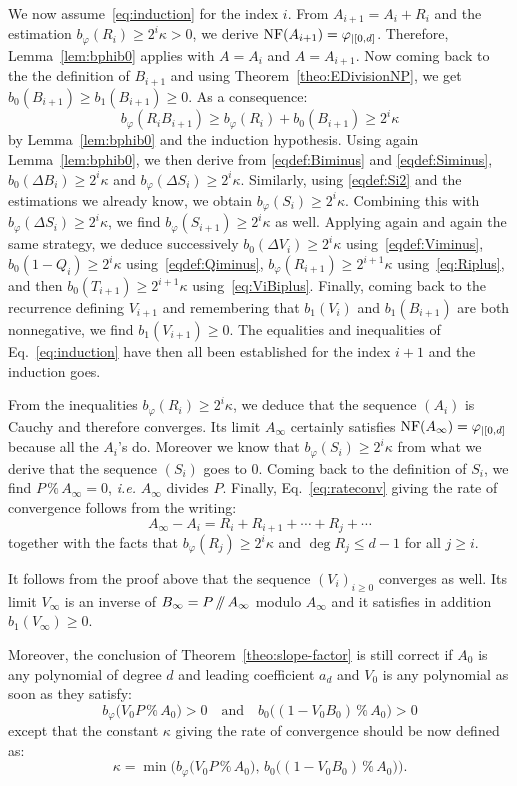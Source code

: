 \documentclass{sig-alternate-2013}
\newcommand{\NF}{\text{\rm NF}}
\renewcommand{\mod}{\,\%\,}
\renewcommand{\div}{\,/\hspace{-0.3em}/\,}
\begin{document}
We now assume~\eqref{eq:induction} for the index $i$.
From $A_{i+1} = A_i + R_i$ and the estimation $b_\varphi(R_i) \geq 2^i 
\kappa > 0$, we derive $\NF(A_{i+1}) = \varphi_{|[0,d]}$. Therefore,
Lemma~\ref{lem:bphib0} applies with $A = A_i$ and $A = A_{i+1}$.
Now coming back to the the definition of $B_{i+1}$ and using
Theorem~\ref{theo:EDivisionNP}, we get $b_0(B_{i+1}) \geq b_1(B_{i+1}) 
\geq 0$. As a consequence:
$$b_\varphi(R_i B_{i+1}) \geq b_\varphi(R_i) + b_0(B_{i+1})
\geq 2^i \kappa$$
by Lemma~\ref{lem:bphib0} and the induction hypothesis.
Using again Lemma~\ref{lem:bphib0}, we then derive from 
\eqref{eqdef:Biminus} and \eqref{eqdef:Siminus}, $b_0(\Delta B_i) \geq 
2^i \kappa$ and $b_\varphi(\Delta S_i) \geq 2^i \kappa$.
Similarly, using \eqref{eqdef:Si2} and the estimations we already know,
we obtain $b_\varphi(S_i) \geq 2^i \kappa$. Combining this with
$b_\varphi(\Delta S_i) \geq 2^i \kappa$, we find
$b_\varphi(S_{i+1}) \geq 2^i \kappa$ as well. Applying again and again
the same strategy, we deduce successively
$b_0(\Delta V_i) \geq 2^i \kappa$ using~\eqref{eqdef:Viminus},
$b_0(1{-}Q_i) \geq 2^i \kappa$ using~\eqref{eqdef:Qiminus},
$b_\varphi(R_{i+1}) \geq 2^{i+1} \kappa$ using~\eqref{eq:Riplus},
and then $b_0(T_{i+1}) \geq 2^{i+1} \kappa$
using~\eqref{eq:ViBiplus}. Finally, coming back to the recurrence
defining $V_{i+1}$ and remembering that $b_1(V_i)$ and $b_1(B_{i+1})$
are both nonnegative, we find $b_1(V_{i+1}) \geq 0$.
The equalities and inequalities
of Eq.~\eqref{eq:induction} have then all been established for
the index $i+1$ and the induction goes.

From the inequalities $b_\varphi(R_i) \geq 2^i \kappa$, we deduce that 
the sequence $(A_i)$ is Cauchy and therefore converges. Its limit 
$A_\infty$ certainly satisfies $\NF(A_\infty) = \varphi_{|[0,d]}$ because 
all the $A_i$'s do. Moreover we know that $b_\varphi(S_i) \geq 2^i 
\kappa$ from what we derive that the sequence $(S_i)$ goes to $0$.
Coming back to the definition of $S_i$, we find $P \mod A_\infty = 0$,
\emph{i.e.} $A_\infty$ divides $P$. Finally, Eq.~\eqref{eq:rateconv}
giving the rate of convergence follows from the writing:
$$A_\infty - A_i = R_i + R_{i+1} + \cdots + R_j + \cdots$$
together with the facts that $b_\varphi(R_j) \geq 2^i \kappa$ and $\deg 
R_j \leq d{-}1$ for all $j \geq i$.

\begin{rem}
\label{rem:slope-factor}
It follows from the proof above that the sequence $(V_i)_{i \geq 0}$
converges as well. Its limit $V_\infty$ is an inverse of $B_\infty
= P \div A_\infty$ modulo $A_\infty$ and it satisfies in addition
$b_1(V_\infty) \geq 0$.

Moreover, the conclusion of 
Theorem~\ref{theo:slope-factor} is still correct if $A_0$ is any 
polynomial of degree $d$ and leading coefficient $a_d$ and $V_0$
is any polynomial as soon as they satisfy:
$$b_\varphi\big(V_0 P \mod A_0\big) > 0
\quad \text{and} \quad
b_0\big((1 - V_0 B_0) \mod A_0\big) > 0$$
except that the constant $\kappa$ giving the rate of convergence
should be now defined as:
$$\kappa = \min \big( 
b_\varphi\big(V_0 P \mod A_0\big), \,
b_0\big((1 - V_0 B_0) \mod A_0\big)\big).$$
\end{rem}
\end{document}
